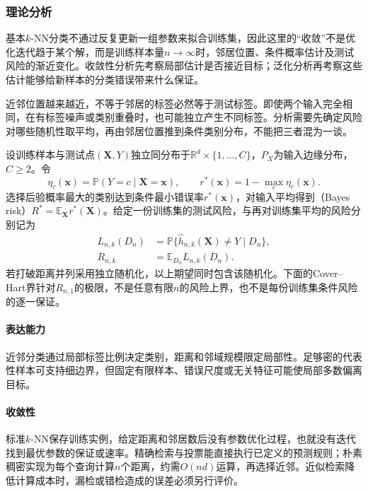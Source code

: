 \subsubsection{理论分析}
\label{sec:classification-knn-theory}

基本$k$-NN分类不通过反复更新一组参数来拟合训练集，因此这里的“收敛”不是优化迭代趋于某个解，而是训练样本量$n\to\infty$时，邻居位置、条件概率估计及测试风险的渐近变化。收敛性分析先考察局部估计是否接近目标；泛化分析再考察这些估计能够给新样本的分类错误带来什么保证。

近邻位置越来越近，不等于邻居的标签必然等于测试标签。即使两个输入完全相同，在有标签噪声或类别重叠时，也可能独立产生不同标签。分析需要先确定风险对哪些随机性取平均，再由邻居位置推到条件类别分布，不能把三者混为一谈。

设训练样本与测试点$(\bm{X},Y)$独立同分布于$\mathbb{R}^d\times\{1,\ldots,C\}$，$P_X$为输入边缘分布，$C\geq2$。令
\begin{equation}
  \eta_c(\bm{x})=\mathbb{P}(Y=c\mid\bm{X}=\bm{x}),
  \qquad
  r^\ast(\bm{x})=1-\max_c\eta_c(\bm{x}).
  \label{eq:classification-local-bayes-risk}
\end{equation}
选择后验概率最大的类别达到条件最小错误率$r^\ast(\bm{x})$，对输入平均得到（Bayes risk）$R^\ast=\mathbb{E}_{\bm{X}}r^\ast(\bm{X})$。给定一份训练集的测试风险，与再对训练集平均的风险分别记为
\begin{align}
  L_{n,k}(D_n)
  &=\mathbb{P}\{\hat h_{n,k}(\bm{X})\neq Y\mid D_n\},
  \label{eq:classification-knn-conditional-risk}\\
  R_{n,k}&=\mathbb{E}_{D_n}L_{n,k}(D_n).
  \label{eq:classification-knn-expected-risk}
\end{align}
若打破距离并列采用独立随机化，以上期望同时包含该随机化。下面的Cover--Hart界针对$R_{n,1}$的极限，不是任意有限$n$的风险上界，也不是每份训练集条件风险的逐一保证。

\paragraph{表达能力}
近邻分类通过局部标签比例决定类别，距离和邻域规模限定局部性。足够密的代表性样本可支持细边界，但固定有限样本、错误尺度或无关特征可能使局部多数偏离目标。

\paragraph{收敛性}
标准$k$-NN保存训练实例，给定距离和邻居数后没有参数优化过程，也就没有迭代找到最优参数的保证或速率。精确检索与投票能直接执行已定义的预测规则；朴素稠密实现为每个查询计算$n$个距离，约需$O(nd)$运算，再选择近邻。近似检索降低计算成本时，漏检或错检造成的误差必须另行评价。

